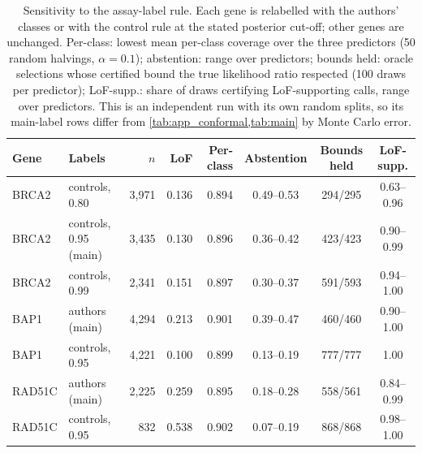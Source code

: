\begin{table}[ht]
\centering
\caption{Sensitivity to the assay-label rule. Each gene is relabelled with the authors' classes or with the control
rule at the stated posterior cut-off; other genes are unchanged. Per-class: lowest mean per-class coverage over the
three predictors (50 random halvings, $\alpha=0.1$); abstention: range over predictors; bounds held: oracle selections
whose certified bound the true likelihood ratio respected (100 draws per predictor); LoF-supp.: share of draws
certifying LoF-supporting calls, range over predictors. This is an independent run with its own random splits, so its
main-label rows differ from \cref{tab:app_conformal,tab:main} by Monte Carlo error.}\label{tab:app_labels}
\setlength{\tabcolsep}{4.5pt}
\begin{tabular}{llrrrccc}
\toprule
Gene & Labels & $n$ & LoF & Per-class & Abstention & Bounds held & LoF-supp.\\
\midrule
BRCA2 & controls, 0.80 & 3,971 & 0.136 & 0.894 & 0.49--0.53 & 294/295 & 0.63--0.96 \\
BRCA2 & controls, 0.95 (main) & 3,435 & 0.130 & 0.896 & 0.36--0.42 & 423/423 & 0.90--0.99 \\
BRCA2 & controls, 0.99 & 2,341 & 0.151 & 0.897 & 0.30--0.37 & 591/593 & 0.94--1.00 \\
BAP1 & authors (main) & 4,294 & 0.213 & 0.901 & 0.39--0.47 & 460/460 & 0.90--1.00 \\
BAP1 & controls, 0.95 & 4,221 & 0.100 & 0.899 & 0.13--0.19 & 777/777 & 1.00 \\
RAD51C & authors (main) & 2,225 & 0.259 & 0.895 & 0.18--0.28 & 558/561 & 0.84--0.99 \\
RAD51C & controls, 0.95 & 832 & 0.538 & 0.902 & 0.07--0.19 & 868/868 & 0.98--1.00 \\
\bottomrule
\end{tabular}
\end{table}

